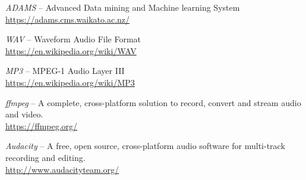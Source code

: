 
\begin{thebibliography}{999}

		\textit{ADAMS} -- Advanced Data mining and Machine learning System \\
		\url{https://adams.cms.waikato.ac.nz/}{}
		
		\textit{WAV} -- Waveform Audio File Format \\
		\url{https://en.wikipedia.org/wiki/WAV}{}
		
		\textit{MP3} -- MPEG-1 Audio Layer III \\
		\url{https://en.wikipedia.org/wiki/MP3}{}

		\textit{ffmpeg} -- A complete, cross-platform solution to record,
		convert and stream audio and video.  \\
		\url{https://ffmpeg.org/}{}

		\textit{Audacity} -- A free, open source, cross-platform audio
		software for multi-track recording and editing.  \\
		\url{http://www.audacityteam.org/}{}

\end{thebibliography}

